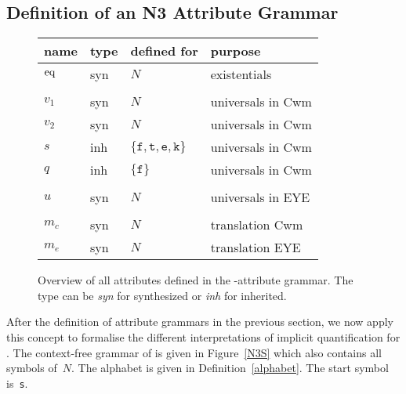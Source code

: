 \subsection{Definition of an N3 Attribute Grammar}
\begin{figure}\centering
\small
\begin{tabular}{llll}
\hline
name \hspace*{0.05\textwidth}
& type \hspace*{0.05\textwidth}
& defined for \hspace*{0.05\textwidth} 
&purpose \\
 \hline
 $\text{eq}$ & syn  & $ N$& existentials\\
 \\
 $v_1$ & syn &$ N$& universals in Cwm \\
 $v_2$ & syn &$ N$ & universals in Cwm\\
 $s$ & inh &$\{\texttt{f}, \texttt{t},\texttt{e}, \texttt{k}\}$& universals in Cwm \\
  $q$ & inh &$\{\texttt{f}\}$& universals in Cwm \\
  \\
  $u$ & syn &$ N$& universals in EYE \\
  \\
  $m_c$ & syn  &$ N$& translation Cwm\\
  $m_e$ &syn &$ N$& translation EYE \\
  \hline
\end{tabular}
\normalsize
\caption{Overview of all attributes defined in the \nthree-attribute grammar. The type can be \emph{syn} for synthesized or \emph{inh} for inherited. \label{attributes}}
\end{figure}

After the definition of attribute grammars in the previous section, 
we now apply this concept to 
formalise the different interpretations of implicit quantification for \nthreelogic. 
The context-free grammar of \nthree is given in Figure~\ref{N3S} which also contains all symbols of~$N$. The alphabet is given in Definition~\ref{alphabet}. 
The start symbol is~\texttt{s}.

